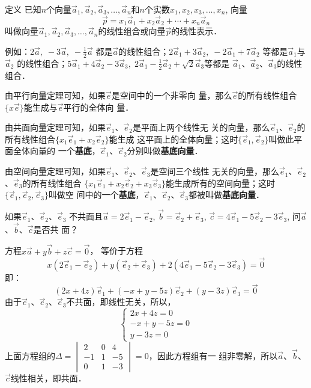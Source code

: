 \begin{blk}
 {定义} 已知$n$个向量$\vec{a}_1,\vec{a}_2,\vec{a}_3,\ldots, \vec{a}_n$和$n$个实数$x_1,x_2,x_3,\ldots,x_n$, 向量
 \[\vec{p}=x_1\vec{a}_1+x_2\vec{a}_2+\cdots+x_n\vec{a}_n\]
叫做向量$\vec{a}_1,\vec{a}_2,\vec{a}_3,\ldots, \vec{a}_n$的线性组合或向量$\vec{p}$的线性表示．
\end{blk}

例如：$2\vec{a},\; -3\vec{a},\; -\frac{1}{2}\vec{a}$
都是$\vec{a}$的线性组合；$2\vec{a}_1+3\vec{a}_2,\; -2\vec{a}_1+7\vec{a}_2$
等都是$\vec{a}_1$与$\vec{a}_2$
的线性组合；$5\vec{a}_1+4\vec{a}_2-3\vec{a}_3,\;  2\vec{a}_1-\frac{1}{2}\vec{a}_2+\sqrt{2}\vec{a}_3$等都是
$\vec{a}_1$、$\vec{a}_2$、$\vec{a}_3$的线性组合．

由平行向量定理可知，如果$\vec{e}$是空间中的一个非零向
量，那么$\vec{e}$的所有线性组合$\{x\vec{e}\}$能生成与$\vec{e}$平行的全体向
量．

由共面向量定理可知，如果$\vec{e}_1$、$\vec{e}_2$是平面上两个线性无
关的向量，那么$\vec{e}_1$、$\vec{e}_2$的所有线性组合$\{x_1\vec{e}_1+x_2\vec{e}_2\}$能生成
这平面上的全体向量；这时$\{\vec{e}_1,\vec{e}_2\}$叫做此平面全体向量的
一个\textbf{基底}，$\vec{e}_1$、$\vec{e}_2$分别叫做\textbf{基底向量}．

由空间向量定理可知，如果$\vec{e}_1$、$\vec{e}_2$、$\vec{e}_3$是空间三个线性
无关的向量，那么$\vec{e}_1$、$\vec{e}_2$、$\vec{e}_3$的所有线性组合
$\{x_1\vec{e}_1+x_2\vec{e}_2+x_3\vec{e}_3\}$能生成所有的空间向量；这时$\{\vec{e}_1,\vec{e}_2,\vec{e}_3\}$叫做空
间中的一个\textbf{基底}，$\vec{e}_1$、$\vec{e}_2$、$\vec{e}_3$都被叫做\textbf{基底向量}．

\begin{example}
    如果$\vec{e}_1$、$\vec{e}_2$、$\vec{e}_3$
不共面且$\vec{a}=2\vec{e}_1-\vec{e}_2$, 
$\vec{b}=\vec{e}_2+\vec{e}_3$, $\vec{c}=4\vec{e}_1-5\vec{e}_2-3\vec{e}_3$, 问$\vec{a}$、$\vec{b}$、$\vec{c}$是否共
面？
\end{example}

\begin{solution}
    方程$x\vec{a}+y\vec{b}+z\vec{c}=\vec{0}$，
等价于方程
\[
x(2\vec{e}_1-\vec{e}_2)+y(\vec{e}_2+\vec{e}_3)+2(4\vec{e}_1-5\vec{e}_2-3\vec{e}_3)=\vec{0}\]
即：
\[(2x+4z)\vec{e}_1+(-x+y-5z)\vec{e}_2+(y-3z)\vec{e}_3=\vec{0}\]
由于$\vec{e}_1$、$\vec{e}_2$、$\vec{e}_3$不共面，即线性无关，所以，
\[\begin{cases}
    2x+4z=0\\ -x+y-5z=0\\ y-3z=0
\end{cases}\]
上面方程组的$\Delta=\begin{vmatrix}
    2&0&4\\
    -1&1&-5\\
    0&1&-3
\end{vmatrix}=0$，因此方程组有一
组非零解，所以$\vec{a}$、$\vec{b}$、$\vec{c}$线性相关，即共面．
\end{solution}

